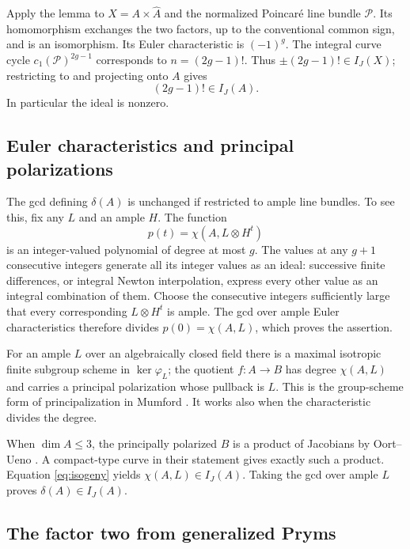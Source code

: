 \documentclass[11pt]{article}
\theoremstyle{definition}
\theoremstyle{remark}
\begin{document}
Apply the lemma to $X=A\times\widehat A$ and the normalized Poincar\'e line bundle $\mathcal P$. Its homomorphism exchanges the two factors, up to the conventional common sign, and is an isomorphism. Its Euler characteristic is $(-1)^g$. The integral curve cycle $c_1(\mathcal P)^{2g-1}$ corresponds to $n=(2g-1)!$. Thus $\pm(2g-1)!\in I_J(X)$; restricting to and projecting onto $A$ gives
\[
                           (2g-1)!\in I_J(A).
\]
In particular the ideal is nonzero.

\subsection{Euler characteristics and principal polarizations}

The gcd defining $\delta(A)$ is unchanged if restricted to ample line bundles. To see this, fix any $L$ and an ample $H$. The function
\[
                       p(t)=\chi(A,L\otimes H^t)
\]
is an integer-valued polynomial of degree at most $g$. The values at any $g+1$ consecutive integers generate all its integer values as an ideal: successive finite differences, or integral Newton interpolation, express every other value as an integral combination of them. Choose the consecutive integers sufficiently large that every corresponding $L\otimes H^t$ is ample. The gcd over ample Euler characteristics therefore divides $p(0)=\chi(A,L)$, which proves the assertion.

For an ample $L$ over an algebraically closed field there is a maximal isotropic finite subgroup scheme in $\ker\varphi_L$; the quotient $f:A\to B$ has degree $\chi(A,L)$ and carries a principal polarization whose pullback is $L$. This is the group-scheme form of principalization in Mumford \cite[\S23, Theorem~4 and Corollary~1, pp.~233--234]{Mumford}. It works also when the characteristic divides the degree.

When $\dim A\leq3$, the principally polarized $B$ is a product of Jacobians by Oort--Ueno \cite[Theorem~4, preprint p.~2]{OortUeno}. A compact-type curve in their statement gives exactly such a product. Equation \eqref{eq:isogeny} yields $\chi(A,L)\in I_J(A)$. Taking the gcd over ample $L$ proves $\delta(A)\in I_J(A)$.

\subsection{The factor two from generalized Pryms}
\end{document}
